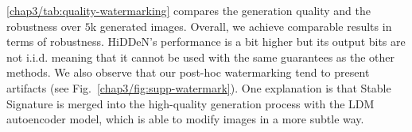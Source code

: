 \autoref{chap3/tab:quality-watermarking} compares the generation quality and the robustness over $5$k generated images.
Overall, we achieve comparable results in terms of robustness. 
HiDDeN's performance is a bit higher but its output bits are not i.i.d. meaning that it cannot be used with the same guarantees as the other methods.
We also observe that our post-hoc watermarking tend to present artifacts (see Fig.~\ref{chap3/fig:supp-watermark}).
One explanation is that Stable Signature is merged into the high-quality generation process with the LDM autoencoder model, which is able to modify images in a more subtle way.




























